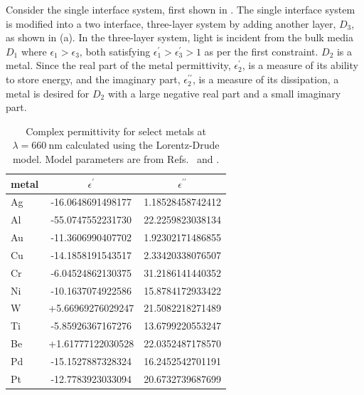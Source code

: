 Consider the single interface system, first shown in
.  The single interface system is modified
into a two interface, three-layer system by adding another layer, $D_3$, as
shown in (a).  In the three-layer system,
light is incident from the bulk media $D_1$ where $\epsilon_1>\epsilon_3$,
both satisfying $\epsilon^\prime_1>\epsilon^\prime_3>1$ as per the first
constraint.  $D_2$ is a metal.  Since the real part of the metal
permittivity, $\epsilon_2^\prime$, is a measure of its ability to store
energy, and the imaginary part, $\epsilon_2^{\prime\prime}$, is a measure of
its dissipation, a metal is desired for $D_2$ with a large negative real
part and a small imaginary part.
\begin{table}[ht]
	\centering
	\begin{tabular}{lSS}
		\toprule
		metal & {$\epsilon^\prime$} & {$\epsilon^{\prime\prime}$} \\
		\midrule
		Ag    & -16.0648691498177   & 1.18528458742412            \\
		Al    & -55.0747552231730   & 22.2259823038134            \\
		Au    & -11.3606990407702   & 1.92302171486855            \\
		Cu    & -14.1858191543517   & 2.33420338076507            \\
		Cr    & -6.04524862130375   & 31.2186141440352            \\
		Ni    & -10.1637074922586   & 15.8784172933422            \\
		W     & +5.66969276029247   & 21.5082218271489            \\
		Ti    & -5.85926367167276   & 13.6799220553247            \\
		Be    & +1.61777122030528   & 22.0352487178570            \\
		Pd    & -15.1527887328324   & 16.2452542701191            \\
		Pt    & -12.7783923033094   & 20.6732739687699            \\
		\bottomrule
	\end{tabular}
	\caption{Complex permittivity for select metals at
		$\lambda=\SI{660}{\nano\meter}$ calculated using the Lorentz-Drude
		model.  Model parameters are from Refs.~\cite{ung2007interference} and
		\cite{rakic1998optical}.}
	\label{tbl:epsmetal600}
\end{table}

